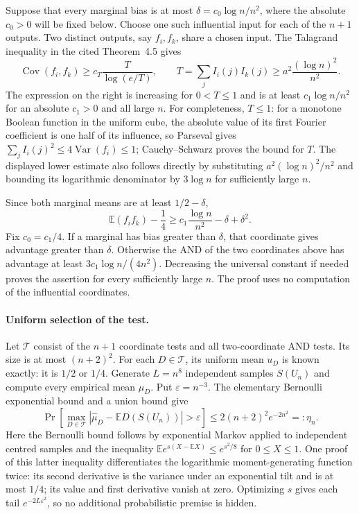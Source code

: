 Suppose that every marginal bias is at most
$\delta=c_0\log n/n^2$, where the absolute $c_0>0$ will be fixed below.
Choose one such influential input for each of the $n+1$ outputs.
Two distinct outputs, say $f_i,f_k$, share a chosen input. The
Talagrand inequality in the cited Theorem~4.5 gives
\[
 \operatorname{Cov}(f_i,f_k)
 \ge c_T\frac{T}{\log(e/T)},\qquad
 T=\sum_j I_i(j)I_k(j)
 \ge a^2\frac{(\log n)^2}{n^2}.
\]
The expression on the right is increasing for $0<T\le1$ and is
at least $c_1\log n/n^2$ for an absolute $c_1>0$ and all large $n$.
For completeness, $T\le1$: for a monotone Boolean function in the
uniform cube, the absolute value of its first Fourier coefficient is one half of its
influence, so Parseval gives $\sum_j I_i(j)^2\le4\operatorname{Var}(f_i)
\le1$; Cauchy--Schwarz proves the bound for $T$.
The displayed lower estimate also follows directly by substituting
$a^2(\log n)^2/n^2$ and bounding its logarithmic denominator by
$3\log n$ for sufficiently large $n$.

Since both marginal means are at least $1/2-\delta$,
\[
 \mathbb E(f_if_k)-\frac14
 \ge c_1\frac{\log n}{n^2}-\delta+\delta^2.
\]
Fix $c_0=c_1/4$. If a marginal has bias greater than $\delta$,
that coordinate gives advantage greater than $\delta$. Otherwise
the AND of the two coordinates above has advantage at least
$3c_1\log n/(4n^2)$. Decreasing the universal constant if needed
proves the assertion for every sufficiently large $n$. The proof
uses no computation of the influential coordinates.

\paragraph{Uniform selection of the test.}
Let $\mathcal T$ consist of the $n+1$ coordinate tests and all
two-coordinate AND tests. Its size is at most $(n+2)^2$.
For each $D\in\mathcal T$, its uniform mean $u_D$ is known exactly:
it is $1/2$ or $1/4$. Generate $L=n^8$ independent samples
$S(U_n)$ and compute every empirical mean $\widehat\mu_D$.
Put $\varepsilon=n^{-3}$. The elementary Bernoulli exponential
bound and a union bound give
\[
 \Pr\left[\max_{D\in\mathcal T}
       |\widehat\mu_D-\mathbb E D(S(U_n))|>\varepsilon\right]
 \le 2(n+2)^2e^{-2n^2}=:\eta_n.                 \tag{S014.1}
\]
Here the Bernoulli bound follows by exponential Markov applied to
independent centred samples and the inequality
$\mathbb E e^{s(X-\mathbb EX)}\le e^{s^2/8}$ for $0\le X\le1$.
One proof of this latter inequality differentiates the logarithmic
moment-generating function twice: its second derivative is the variance
under an exponential tilt and is at most $1/4$; its value and first
derivative vanish at zero. Optimizing $s$ gives each tail
$e^{-2L\varepsilon^2}$, so no additional probabilistic premise is hidden.

